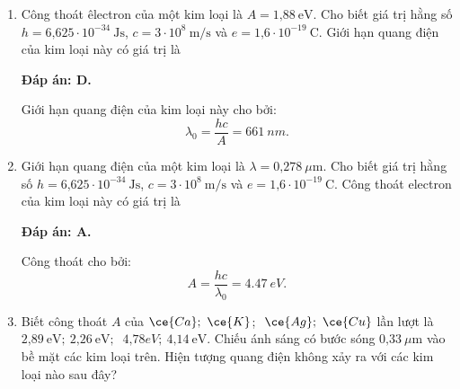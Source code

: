 \begin{enumerate}[label=\bfseries Câu \arabic*:]
	\item {} 
		\cauhoi
	{Công thoát êlectron của một kim loại là $A=\text{1,88}\ \text{eV}$. Cho biết giá trị hằng số $h=\text{6,625}\cdot 10^{-34}\ \text{Js}$, $c=3\cdot 10^8\ \text{m/s}$ và $e=\text{1,6}\cdot 10^{-19}\ \text{C}$. Giới hạn quang điện của kim loại này có giá trị là
	}
	
	\loigiai
	{		\textbf{Đáp án: D.}
		
Giới hạn quang điện của kim loại này cho bởi:
$$
	\lambda_{0} = \dfrac{hc}{A} = \SI{661}{nm}.
$$
		
	}
	
	\item {} 
		\cauhoi
	{Giới hạn quang điện của một kim loại là $\lambda =\text{0,278}\ \mu\text{m}$. Cho biết giá trị hằng số $h=\text{6,625}\cdot 10^{-34}\ \text{Js}$, $c=3\cdot 10^8\ \text{m/s}$ và $e=\text{1,6}\cdot 10^{-19}\ \text{C}$. Công thoát electron của kim loại này có giá trị là
	}
	
	\loigiai
	{		\textbf{Đáp án: A.}
		
Công thoát cho bởi:
$$
	A = \dfrac{hc}{\lambda_{0}} = \SI{4,47}{eV}.
$$
		
	}
	
	\item {}
		\cauhoi
	{Biết công thoát $A$ của $\ce{Ca};\ \ce{K}$; $\ \ce{Ag};\ \ce{Cu}$ lần lượt là $\text{2,89}\ \text{eV};\ \text{2,26}\ \text{eV};$ $\ \text{4,78} eV;\ \text{4,14}\ \text{eV}$. Chiếu ánh sáng có bước sóng $\text{0,33}\ \mu\text{m}$ vào bề mặt các kim loại trên. Hiện tượng quang điện không xảy ra với các kim loại nào sau đây?
	}
	

\end{enumerate}
